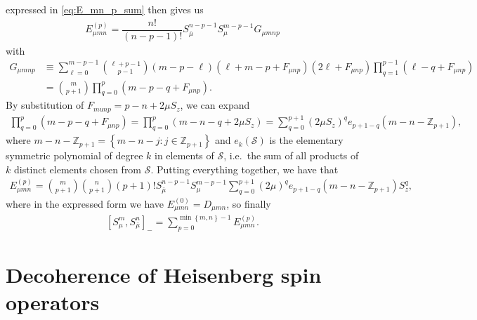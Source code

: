 \documentclass[aps,notitlepage,nofootinbib,11pt]{revtex4-1}
\newcommand{\f}[2]{\dfrac{#1}{#2}} %
\newcommand{\p}[1]{\left(#1\right)} %
\renewcommand{\sp}[1]{\left[#1\right]} %
\renewcommand{\set}[1]{\left\{#1\right\}} %
\renewcommand{\S}{\mathcal{S}}
\newcommand{\Z}{\mathbb{Z}}
\newcommand{\bmu}{{\bar\mu}}
\newcommand{\1}{\mathds{1}}
\begin{document}
expressed in \eqref{eq:E_mn_p_sum} then gives us
\begin{align}
  E_{\mu mn}^{(p)}
  = \f{n!}{\p{n-p-1}!} S_\bmu^{n-p-1} S_\mu^{m-p-1} G_{\mu mnp}
\end{align}
with
\begin{align}
  G_{\mu mnp}
  &\equiv \sum_{\ell=0}^{m-p-1} { \ell + p - 1 \choose p - 1 }
  \p{m-p-\ell} \p{\ell+m-p+F_{\mu np}}
  \p{2\ell + F_{\mu np}}
  \prod_{q=1}^{p-1} \p{\ell-q+F_{\mu np}} \\
  &= { m \choose p + 1 } \prod_{q=0}^p \p{m-p-q+F_{\mu np}}.
\end{align}
By substitution of $F_{mu np}=p-n+2\mu S_z$, we can expand
\begin{align}
  \prod_{q=0}^p \p{m-p-q+F_{\mu np}}
  = \prod_{q=0}^p \p{m-n-q+2\mu S_z}
  = \sum_{q=0}^{p+1} \p{2\mu S_z}^q e_{p+1-q}\p{m-n-\Z_{p+1}},
\end{align}
where $m-n-\Z_{p+1}=\set{m-n-j:j\in\Z_{p+1}}$ and $e_k\p{\S}$ is the
elementary symmetric polynomial of degree $k$ in elements of $\S$,
i.e.~the sum of all products of $k$ distinct elements chosen from
$\S$.  Putting everything together, we have that
\begin{align}
  E_{\mu mn}^{(p)}
  = { m \choose p + 1 } { n \choose p + 1 } \p{p+1}!
  S_\bmu^{n-p-1} S_\mu^{m-p-1}
  \sum_{q=0}^{p+1} \p{2\mu}^q e_{p+1-q}\p{m-n-\Z_{p+1}} S_z^q,
\end{align}
where in the expressed form we have $E_{\mu mn}^{(0)} = D_{\mu mn}$,
so finally
\begin{align}
  \sp{S_\mu^m, S_\bmu^n}_-
  = \sum_{p=0}^{\min\set{m,n}-1} E_{\mu mn}^{(p)}.
\end{align}


\newpage
\section{Decoherence of Heisenberg spin operators}
\label{sec:decoherence}
\end{document}
